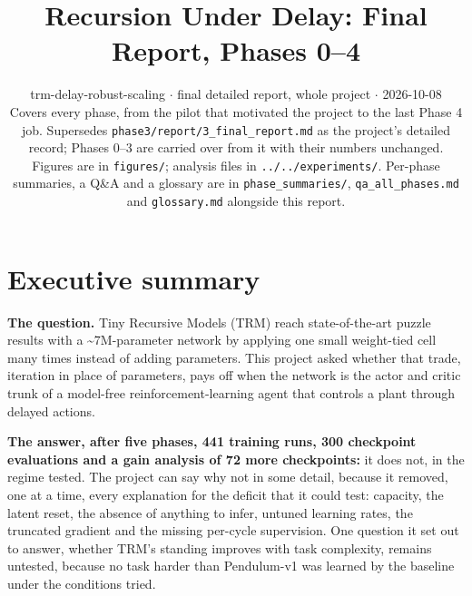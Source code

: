 \documentclass[11pt]{article}
\title{Recursion Under Delay: Final Report, Phases 0--4}
\author{}
\date{trm-delay-robust-scaling $\cdot$ final detailed report, whole project $\cdot$ 2026-10-08\\[2pt]Covers every phase, from the pilot that motivated the project to the last Phase 4 job. Supersedes \texttt{phase3/\allowbreak{}report/\allowbreak{}3\_\allowbreak{}final\_\allowbreak{}report.\allowbreak{}md} as the project's detailed record; Phases 0--3 are carried over from it with their numbers unchanged. Figures are in \texttt{figures/}; analysis files in \texttt{.\allowbreak{}.\allowbreak{}/\allowbreak{}.\allowbreak{}.\allowbreak{}/\allowbreak{}experiments/\allowbreak{}}. Per-phase summaries, a Q\&A and a glossary are in \texttt{phase\_\allowbreak{}summaries/\allowbreak{}}, \texttt{qa\_\allowbreak{}all\_\allowbreak{}phases.\allowbreak{}md} and \texttt{glossary.md} alongside this report.}
\begin{document}
\maketitle
\tableofcontents
\clearpage



\section*{Executive summary}



\textbf{The question.} Tiny Recursive Models (TRM) reach state-of-the-art puzzle results with a \textasciitilde{}7M-parameter network by applying one small weight-tied cell many times instead of adding parameters. This project asked whether that trade, iteration in place of parameters, pays off when the network is the actor and critic trunk of a model-free reinforcement-learning agent that controls a plant through delayed actions.



\textbf{The answer, after five phases, 441 training runs, 300 checkpoint evaluations and a gain analysis of 72 more checkpoints:} it does not, in the regime tested. The project can say why not in some detail, because it removed, one at a time, every explanation for the deficit that it could test: capacity, the latent reset, the absence of anything to infer, untuned learning rates, the truncated gradient and the missing per-cycle supervision. One question it set out to answer, whether TRM's standing improves with task complexity, remains untested, because no task harder than Pendulum-v1 was learned by the baseline under the conditions tried.
\end{document}
